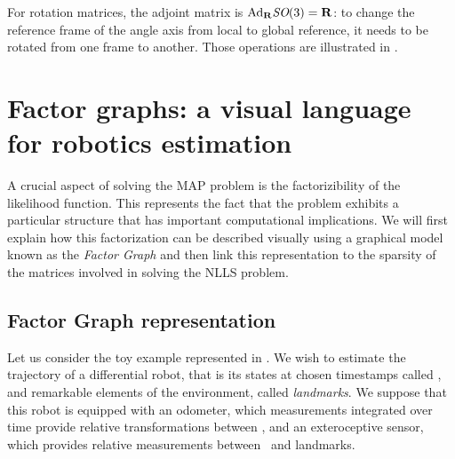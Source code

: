 For rotation matrices, the adjoint matrix is $\text{Ad}_{{\bf R}}\textit{SO}(3)={\bf R}$: to change the reference frame of the angle axis from local to global reference, it needs
to be rotated from one frame to another. Those operations are illustrated in .


%
%
%
\section{Factor graphs: a visual language for robotics estimation}
\label{sec:factor_graphs}

A crucial aspect of solving the MAP problem is the factorizibility of the likelihood function. This represents the fact that the problem
exhibits a particular structure that has important computational implications. We will first explain how this factorization can be described 
visually using a graphical model known as the \textit{Factor Graph} and then link this representation to the sparsity of the matrices involved
in solving the NLLS problem.


\subsection{Factor Graph representation}
Let us consider the toy example represented in . 
We wish to estimate the trajectory of a differential robot, that is its states at chosen timestamps called \textit{\keyframes}, and remarkable elements 
of the environment, called \textit{landmarks}. We suppose that this robot is equipped with an odometer, which measurements integrated over time provide relative 
transformations between \keyframes, and an exteroceptive sensor, which provides relative measurements between \keyframes~and landmarks.

